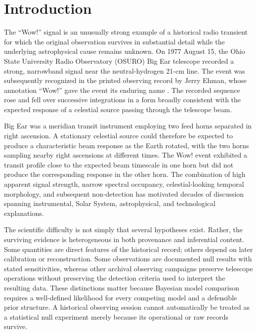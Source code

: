 \documentclass[twocolumn]{aastex701}
\begin{document}


\section{Introduction}
\label{sec:intro}

The ``Wow!'' signal is an unusually strong example of a historical radio transient for which the original observation survives in substantial detail while the underlying astrophysical cause remains unknown. On 1977 August 15, the Ohio State University Radio Observatory (OSURO) Big Ear telescope recorded a strong, narrowband signal near the neutral-hydrogen 21-cm line. The event was subsequently recognized in the printed observing record by Jerry Ehman, whose annotation ``Wow!'' gave the event its enduring name \citep{ehman1997}. The recorded sequence rose and fell over successive integrations in a form broadly consistent with the expected response of a celestial source passing through the telescope beam.

Big Ear was a meridian transit instrument employing two feed horns separated in right ascension. A stationary celestial source could therefore be expected to produce a characteristic beam response as the Earth rotated, with the two horns sampling nearby right ascensions at different times. The Wow! event exhibited a transit profile close to the expected beam timescale in one horn but did not produce the corresponding response in the other horn. The combination of high apparent signal strength, narrow spectral occupancy, celestial-looking temporal morphology, and subsequent non-detection has motivated decades of discussion spanning instrumental, Solar System, astrophysical, and technological explanations.

The scientific difficulty is not simply that several hypotheses exist. Rather, the surviving evidence is heterogeneous in both provenance and inferential content. Some quantities are direct features of the historical record; others depend on later calibration or reconstruction. Some observations are documented null results with stated sensitivities, whereas other archival observing campaigns preserve telescope operations without preserving the detection criteria used to interpret the resulting data. These distinctions matter because Bayesian model comparison requires a well-defined likelihood for every competing model and a defensible prior structure. A historical observing session cannot automatically be treated as a statistical null experiment merely because its operational or raw records survive.
\end{document}
